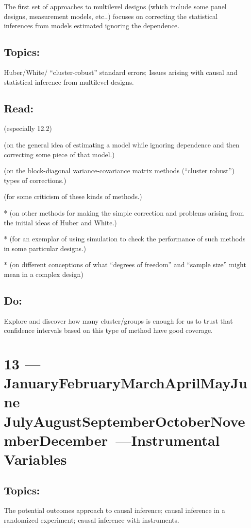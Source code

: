 \documentclass[10pt]{article}
\def\themonth{\ifcase\month\or
  January\or February\or March\or April\or May\or June\or
  July\or August\or September\or October\or November\or December\fi}
\begin{document}
The first set of approaches to multilevel designs (which include some
panel designs, measurement models, etc..) focuses on correcting the
statistical inferences from models estimated ignoring the
dependence.

\subsection{Topics:} Huber/White/ ``cluster-robust'' standard errors;
Issues arising with causal and statistical inference from multilevel designs.

\subsection{Read:}
\citealp[Chap 12]{fox2008applied} (especially 12.2)

\citealp{LongErvi:2000} (on the general idea of estimating a model while
ignoring dependence and then correcting some piece of that model.)

\citealp{wooldridge2003csm} (on the block-diagonal variance-covariance
matrix methods (``cluster robust'') types of corrections.)

\citealp{Free:2006:On-t} (for some criticism of these kinds of methods.)

*\citealp{cribarineto2004aiu} (on other methods for making the simple
correction and problems arising from the initial ideas of Huber and White.)

*\citealp{green2007acr} (for an exemplar of using simulation to check the performance of such methods in some particular designs.)

*\cite{faes2009effective} (on different conceptions of what ``degrees of
freedom'' and ``sample size'' might mean in a complex design)

\subsection{Do:} Explore and discover how many cluster/groups is
enough for us to trust that confidence intervals based on this
type of method have good coverage.

\AdvanceDate[7]
\section{13 ---\themonth~\the\day---Instrumental Variables}

\subsection{Topics:} The potential outcomes approach to causal
inference; causal inference in a randomized experiment; causal
inference with instruments.
\end{document}
